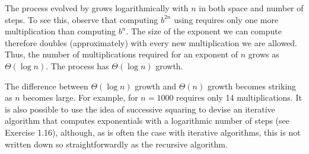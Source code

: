 The process evolved by  grows logarithmically with $n$ in both space and number of steps. To see this, observe that computing $b^{2n}$ using  requires only one more multiplication than computing $b^n$. The size of the exponent we can compute therefore doubles (approximately) with every new multiplication we are allowed. Thus, the number of multiplications required for an exponent of $n$ grows as $\Theta(\log n)$. The process has $\Theta(\log n)$ growth.

The difference between $\Theta(\log n)$ growth and $\Theta(n)$ growth becomes striking as $n$ becomes large. For example,  for $n = 1000$ requires only 14 multiplications. It is also possible to use the idea of successive squaring to devise an iterative algorithm that computes exponentials with a logarithmic number of steps (see Exercise 1.16), although, as is often the case with iterative algorithms, this is not written down so straightforwardly as the recursive algorithm.

